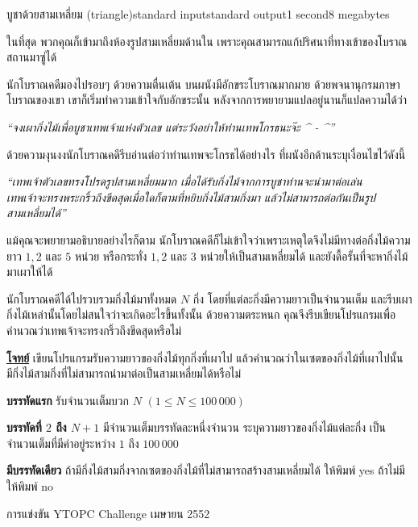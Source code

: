 \documentclass[11pt,a4paper]{article}
\begin{document}
\begin{problem}{บูชาด้วยสามเหลี่ยม (triangle)}{standard input}{standard output}{1 second}{8 megabytes}

  ในที่สุด พวกคุณก็เข้ามาถึงห้องรูปสามเหลี่ยมด้านใน เพราะคุณสามารถแก้ปริศนาที่ทางเข้าของโบราณสถานมาซู่ได้
  
    นักโบราณคดีมองไปรอบๆ ด้วยความตื่นเต้น บนผนังมีอักขระโบราณมากมาย ด้วยพจนานุกรมภาษาโบราณของเขา เขาก็เริ่มทำความเข้าใจกับอักขระนั้น หลังจากการพยายามแปลอยู่นานก็แปลความได้ว่า


\begin{center}\textit{“จงเผากิ่งไม้เพื่อบูชาเทพเจ้าแห่งตัวเลข  แต่ระวังอย่าให้ท่านเทพโกรธนะจ๊ะ  \^{} - \^{}”}\end{center}


    ด้วยความงุนงงนักโบราณคดีรีบอ่านต่อว่าท่านเทพจะโกรธได้อย่างไร  ที่ผนังอีกด้านระบุเงื่อนไขไว้ดังนี้

\begin{center}
\textit{“เทพเจ้าตัวเลขทรงโปรดรูปสามเหลี่ยมมาก เมื่อได้รับกิ่งไม้จากการบูชาท่านจะนำมาต่อเล่น}\\  \textit{เทพเจ้าจะทรงพระกริ้วถึงขีดสุดเมื่อใดก็ตามที่หยิบกิ่งไม้สามกิ่งมา แล้วไม่สามารถต่อกันเป็นรูปสามเหลี่ยมได้”}
\end{center}

    แม้คุณจะพยายามอธิบายอย่างไรก็ตาม นักโบราณคดีก็ไม่เข้าใจว่าเพราะเหตุใดจึงไม่มีทางต่อกิ่งไม้ความยาว $1,2$ และ $5$ หน่วย หรือกระทั่ง $1, 2$ และ $3$ หน่วยให้เป็นสามเหลี่ยมได้  และยังดื้อรั้นที่จะหากิ่งไม้มาเผาให้ได้
    
    นักโบราณคดีได้ไปรวบรวมกิ่งไม้มาทั้งหมด $N$ กิ่ง โดยที่แต่ละกิ่งมีความยาวเป็นจำนวนเต็ม และรีบเผากิ่งไม้เหล่านั้นโดยไม่สนใจว่าจะเกิดอะไรขึ้นทั้งนั้น ด้วยความตระหนก คุณจึงรีบเขียนโปรแกรมเพื่อคำนวณว่าเทพเจ้าจะทรงกริ้วถึงขีดสุดหรือไม่
    
\bigskip
\underline{\textbf{โจทย์}} เขียนโปรแกรมรับความยาวของกิ่งไม้ทุกกิ่งที่เผาไป แล้วคำนวณว่าในเซตของกิ่งไม้ที่เผาไปนั้น มีกิ่งไม้สามกิ่งที่ไม่สามารถนำมาต่อเป็นสามเหลี่ยมได้หรือไม่

\InputFile

\textbf{บรรทัดแรก} รับจำนวนเต็มบวก $N$ $(1 \leq N \leq 100\,000)$

\textbf{บรรทัดที่ $2$ ถึง $N+1$} มีจำนวนเต็มบรรทัดละหนึ่งจำนวน ระบุความยาวของกิ่งไม้แต่ละกิ่ง เป็นจำนวนเต็มที่มีค่าอยู่ระหว่าง $1$ ถึง $100\,000$


\OutputFile

\textbf{มีบรรทัดเดียว}  ถ้ามีกิ่งไม้สามกิ่งจากเซตของกิ่งไม้ที่ไม่สามารถสร้างสามเหลี่ยมได้ ให้พิมพ์ yes ถ้าไม่มีให้พิมพ์ no


\Examples

\begin{example}
%
%
\end{example}


\Source

การแข่งขัน YTOPC Challenge เมษายน 2552


\end{problem}
\end{document}
